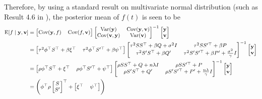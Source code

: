 Therefore, by using a standard result on multivariate normal distribution (such as Result 4.6 in \citep{johnson1992applied}), the posterior mean of $f(t)$ is seen to be 
\begin{align}\label{GPrhoeq}\footnotesize
\begin{split}
\E \lbrack f \mid  \mathbf{\mathbf{y}},\mathbf{v}\rbrack & =
\begin{bmatrix}
\Cov (\mathbf{y},f) & \Cov (f,\mathbf{\mathbf{v}})
\end{bmatrix}\begin{bmatrix}
\Var(\mathbf{y}) & \Cov(\mathbf{y},\mathbf{v})\\
\Cov(\mathbf{v},\mathbf{y}) & \Var(\mathbf{v})
\end{bmatrix}^{-1}\begin{bmatrix}
\mathbf{y}\\\mathbf{v}
\end{bmatrix}\\
&=
\begin{bmatrix}
\tau^2 \phi^\top S^\top+\beta \xi^\top & \tau^2  \phi^\top S'^\top+\beta \psi^\top 
\end{bmatrix}\begin{bmatrix}
\tau^2 SS^\top+\beta Q+\sigma^2 I& \tau^2 SS'^\top+\beta P\\
\tau^2 S'S^\top+\beta Q'& \tau^2 S'S'^\top+\beta P'+\frac{\sigma^2}{\gamma}I
\end{bmatrix}^{-1}\begin{bmatrix}
\mathbf{y}\\\mathbf{v}
\end{bmatrix}\\
&=
\begin{bmatrix}
\rho\phi^\top S^\top+ \xi^\top & \rho\phi^\top S'^\top+\psi^\top
\end{bmatrix}\begin{bmatrix}
\rho SS^\top+Q+n\lambda I& \rho SS'^\top+P\\
\rho S'S^\top+Q'& \rho S'S'^\top+P'+\frac{n\lambda}{\gamma}I
\end{bmatrix}^{-1}\begin{bmatrix}
\mathbf{y}\\\mathbf{v}
\end{bmatrix}\\
&=\left(\phi^\top \rho 
\begin{bmatrix} S\\ S' \end{bmatrix}^\top + \begin{bmatrix} \xi^\top & \psi^\top\end{bmatrix}\right)

\end{split}
\end{align}
